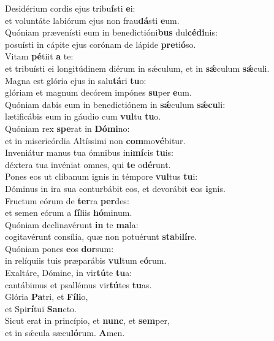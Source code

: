 \evenverse Desidérium cordis ejus tribu\textbf{í}sti \textbf{e}i:~\*\\
\evenverse et voluntáte labiórum ejus non frau\textbf{dá}sti \textbf{e}um.\\
\oddverse Quóniam prævenísti eum in benedictióni\textbf{bus} dul\textbf{cé}\textbf{di}nis:~\*\\
\oddverse posuísti in cápite ejus corónam de lápide \textbf{pre}ti\textbf{ó}so.\\
\evenverse Vitam \textbf{pé}tiit \textbf{a} te:~\*\\
\evenverse et tribuísti ei longitúdinem diérum in sǽculum, et in \textbf{sǽ}culum \textbf{sǽ}culi.\\
\oddverse Magna est glória ejus in salu\textbf{tá}ri \textbf{tu}o:~\*\\
\oddverse glóriam et magnum decórem impónes \textbf{su}per \textbf{e}um.\\
\evenverse Quóniam dabis eum in benedictiónem in \textbf{sǽ}culum \textbf{sǽ}\textbf{cu}li:~\*\\
\evenverse lætificábis eum in gáudio cum \textbf{vul}tu \textbf{tu}o.\\
\oddverse Quóniam rex \textbf{spe}rat in \textbf{Dó}\textbf{mi}no:~\*\\
\oddverse et in misericórdia Altíssimi non \textbf{com}mo\textbf{vé}bitur.\\
\evenverse Inveniátur manus tua ómnibus ini\textbf{mí}cis \textbf{tu}is:~\*\\
\evenverse déxtera tua invéniat omnes, qui \textbf{te} o\textbf{dé}runt.\\
\oddverse Pones eos ut clíbanum ignis in témpore \textbf{vul}tus \textbf{tu}i:~\*\\
\oddverse Dóminus in ira sua conturbábit eos, et devorábit \textbf{e}os \textbf{i}gnis.\\
\evenverse Fructum eórum de \textbf{ter}ra \textbf{per}des:~\*\\
\evenverse et semen eórum a \textbf{fí}liis \textbf{hó}minum.\\
\oddverse Quóniam declinavérunt \textbf{in} te \textbf{ma}la:~\*\\
\oddverse cogitavérunt consília, quæ non potuérunt \textbf{sta}bi\textbf{lí}re.\\
\evenverse Quóniam pones \textbf{e}os \textbf{dor}sum:~\*\\
\evenverse in relíquiis tuis præparábis \textbf{vul}tum e\textbf{ó}rum.\\
\oddverse Exaltáre, Dómine, in vir\textbf{tú}te \textbf{tu}a:~\*\\
\oddverse cantábimus et psallémus vir\textbf{tú}tes \textbf{tu}as.\\
\evenverse Glória \textbf{Pa}tri, et \textbf{Fí}\textbf{li}o,~\*\\
\evenverse et Spi\textbf{rí}tui \textbf{San}cto.\\
\oddverse Sicut erat in princípio, et \textbf{nunc}, et \textbf{sem}per,~\*\\
\oddverse et in sǽcula sæcu\textbf{ló}rum. \textbf{A}men.\\
